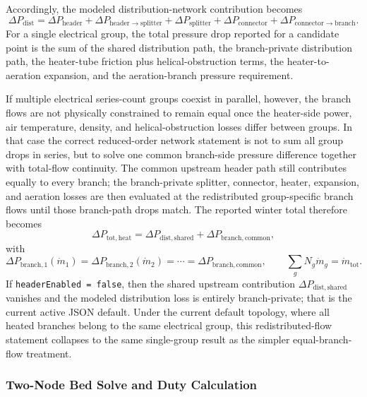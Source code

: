 \documentclass{article}
\begin{document}
Accordingly, the modeled distribution-network contribution becomes
\begin{equation}
\Delta P_{\mathrm{dist}}
=
\Delta P_{\mathrm{header}}
+ \Delta P_{\mathrm{header\rightarrow splitter}}
+ \Delta P_{\mathrm{splitter}}
+ \Delta P_{\mathrm{connector}}
+ \Delta P_{\mathrm{connector\rightarrow branch}}.
\end{equation}
For a single electrical group, the total pressure drop reported for a candidate
point is the sum of the shared distribution path, the branch-private
distribution path, the heater-tube friction plus helical-obstruction terms, the
heater-to-aeration expansion, and the aeration-branch pressure requirement.

If multiple electrical series-count groups coexist in parallel, however, the
branch flows are not physically constrained to remain equal once the heater-side
power, air temperature, density, and helical-obstruction losses differ between
groups. In that case the correct reduced-order network statement is not to sum
all group drops in series, but to solve one common branch-side pressure
difference together with total-flow continuity. The common upstream header path
still contributes equally to every branch; the branch-private splitter,
connector, heater, expansion, and aeration losses are then evaluated at the
redistributed group-specific branch flows until those branch-path drops match.
The reported winter total therefore becomes
\[
\Delta P_{\mathrm{tot,heat}} = \Delta P_{\mathrm{dist,shared}} + \Delta P_{\mathrm{branch,common}},
\]
with
\[
\Delta P_{\mathrm{branch},1}(\dot m_1)=\Delta P_{\mathrm{branch},2}(\dot m_2)=\cdots=\Delta P_{\mathrm{branch,common}},
\qquad
\sum_g N_g\dot m_g = \dot m_{\mathrm{tot}}.
\]
If \texttt{headerEnabled = false}, then the shared upstream contribution
\(\Delta P_{\mathrm{dist,shared}}\) vanishes and the modeled distribution loss is
entirely branch-private; that is the current active JSON default. Under the
current default topology, where all heated branches belong to the same
electrical group, this redistributed-flow statement collapses to the same
single-group result as the simpler equal-branch-flow treatment.

\subsubsection{Two-Node Bed Solve and Duty Calculation}
\end{document}
